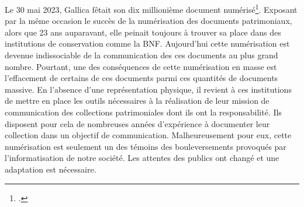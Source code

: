 
Le 30 mai 2023, Gallica fêtait son dix millionième document numérisé\footcite[]{gallica10}. Exposant par la même occasion le succès de la numérisation des documents patrimoniaux, alors que 23 ans auparavant, elle peinait toujours à trouver sa place dans des institutions de conservation comme la BNF. Aujourd'hui cette numérisation est devenue indissociable de la communication des ces documents au plus grand nombre. Pourtant, une des conséquences de cette numérisation en masse est l'effacement de certains de ces documents parmi ces quantités de documents massive. En l'absence d'une représentation physique, il revient à ces institutions de mettre en place les outils nécessaires à la réalisation de leur mission de communication des collections patrimoniales dont ils ont la responsabilité. Ils disposent pour cela de nombreuses années d'expérience à documenter leur collection dans un objectif de communication. Malheureusement pour eux, cette numérisation est seulement un des témoins des bouleversements provoqués par l'informatisation de notre société. Les attentes des publics ont changé et une adaptation est nécessaire. 


